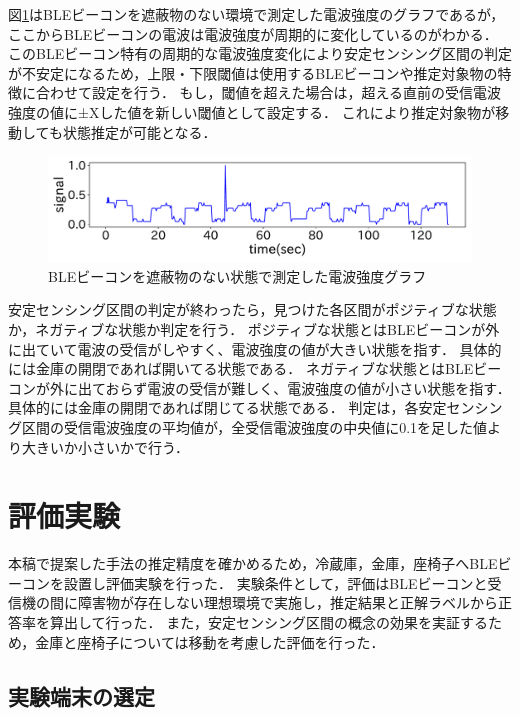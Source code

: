 図\ref{nomal-data}はBLEビーコンを遮蔽物のない環境で測定した電波強度のグラフであるが，ここからBLEビーコンの電波は電波強度が周期的に変化しているのがわかる．
このBLEビーコン特有の周期的な電波強度変化により安定センシング区間の判定が不安定になるため，上限・下限閾値は使用するBLEビーコンや推定対象物の特徴に合わせて設定を行う．
もし，閾値を超えた場合は，超える直前の受信電波強度の値に±Xした値を新しい閾値として設定する．
これにより推定対象物が移動しても状態推定が可能となる．

\begin{figure}[tbh]
    \centering
    \includegraphics[width=14cm]{images/chapter3/bokoboko.pdf}
    \caption{BLEビーコンを遮蔽物のない状態で測定した電波強度グラフ}
    \label{nomal-data}
\end{figure}

安定センシング区間の判定が終わったら，見つけた各区間がポジティブな状態か，ネガティブな状態か判定を行う．
ポジティブな状態とはBLEビーコンが外に出ていて電波の受信がしやすく、電波強度の値が大きい状態を指す．
具体的には金庫の開閉であれば開いてる状態である．
ネガティブな状態とはBLEビーコンが外に出ておらず電波の受信が難しく、電波強度の値が小さい状態を指す．
具体的には金庫の開閉であれば閉じてる状態である．
判定は，各安定センシング区間の受信電波強度の平均値が，全受信電波強度の中央値に0.1を足した値より大きいか小さいかで行う．


\section{評価実験}
本稿で提案した手法の推定精度を確かめるため，冷蔵庫，金庫，座椅子へBLEビーコンを設置し評価実験を行った．
実験条件として，評価はBLEビーコンと受信機の間に障害物が存在しない理想環境で実施し，推定結果と正解ラベルから正答率を算出して行った．
また，安定センシング区間の概念の効果を実証するため，金庫と座椅子については移動を考慮した評価を行った．


\subsection{実験端末の選定}


